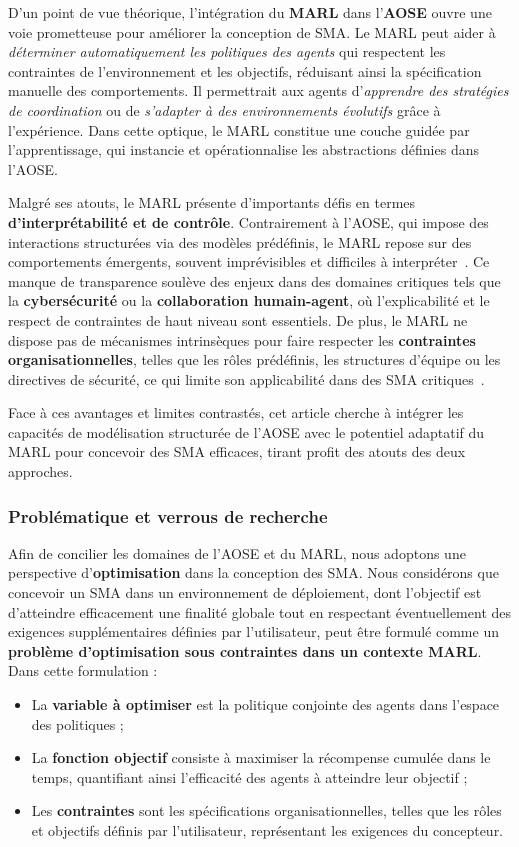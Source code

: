 D'un point de vue théorique, l'intégration du \textbf{MARL} dans l'\textbf{AOSE} ouvre une voie prometteuse pour améliorer la conception de SMA. Le MARL peut aider à \textit{déterminer automatiquement les politiques des agents} qui respectent les contraintes de l'environnement et les objectifs, réduisant ainsi la spécification manuelle des comportements. Il permettrait aux agents d'\textit{apprendre des stratégies de coordination} ou de \textit{s'adapter à des environnements évolutifs} grâce à l'expérience. Dans cette optique, le MARL constitue une couche guidée par l'apprentissage, qui instancie et opérationnalise les abstractions définies dans l'AOSE.

Malgré ses atouts, le MARL présente d'importants défis en termes \textbf{d'interprétabilité et de contrôle}. Contrairement à l'AOSE, qui impose des interactions structurées via des modèles prédéfinis, le MARL repose sur des comportements émergents, souvent imprévisibles et difficiles à interpréter~\cite{Du2022}. Ce manque de transparence soulève des enjeux dans des domaines critiques tels que la \textbf{cybersécurité} ou la \textbf{collaboration humain-agent}, où l'explicabilité et le respect de contraintes de haut niveau sont essentiels. De plus, le MARL ne dispose pas de mécanismes intrinsèques pour faire respecter les \textbf{contraintes organisationnelles}, telles que les rôles prédéfinis, les structures d'équipe ou les directives de sécurité, ce qui limite son applicabilité dans des SMA critiques~\cite{Nguyen2020}.

Face à ces avantages et limites contrastés, cet article cherche à intégrer les capacités de modélisation structurée de l'AOSE avec le potentiel adaptatif du MARL pour concevoir des SMA efficaces, tirant profit des atouts des deux approches.

\subsubsection{Problématique et verrous de recherche}

Afin de concilier les domaines de l'AOSE et du MARL, nous adoptons une perspective d'\textbf{optimisation} dans la conception des SMA. Nous considérons que concevoir un SMA dans un environnement de déploiement, dont l'objectif est d'atteindre efficacement une finalité globale tout en respectant éventuellement des exigences supplémentaires définies par l'utilisateur, peut être formulé comme un \textbf{problème d'optimisation sous contraintes dans un contexte MARL}. Dans cette formulation :
\begin{itemize}
    \item La \textbf{variable à optimiser} est la politique conjointe des agents dans l'espace des politiques ;
    \item La \textbf{fonction objectif} consiste à maximiser la récompense cumulée dans le temps, quantifiant ainsi l'efficacité des agents à atteindre leur objectif ;
    \item Les \textbf{contraintes} sont les spécifications organisationnelles, telles que les rôles et objectifs définis par l'utilisateur, représentant les exigences du concepteur.
\end{itemize}

